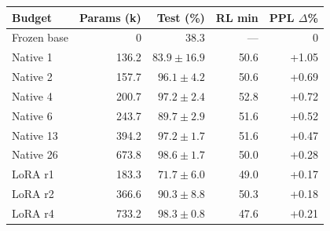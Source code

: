 \begin{tabular}{@{}lrrrr@{}}
\toprule
Budget & Params (k) & Test (\%) & RL min & PPL $\Delta$\%\\
\midrule
Frozen base & 0 & 38.3 & --- & 0\\
Native 1 & 136.2 & $83.9\pm16.9$ & 50.6 & +1.05\\
Native 2 & 157.7 & $96.1\pm4.2$ & 50.6 & +0.69\\
Native 4 & 200.7 & $97.2\pm2.4$ & 52.8 & +0.72\\
Native 6 & 243.7 & $89.7\pm2.9$ & 51.6 & +0.52\\
Native 13 & 394.2 & $97.2\pm1.7$ & 51.6 & +0.47\\
Native 26 & 673.8 & $98.6\pm1.7$ & 50.0 & +0.28\\
LoRA r1 & 183.3 & $71.7\pm6.0$ & 49.0 & +0.17\\
LoRA r2 & 366.6 & $90.3\pm8.8$ & 50.3 & +0.18\\
LoRA r4 & 733.2 & $98.3\pm0.8$ & 47.6 & +0.21\\
\bottomrule
\end{tabular}
